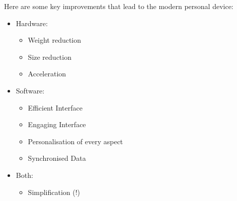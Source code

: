 Here are some key improvements that lead to the modern personal device:
\begin{itemize}
\item Hardware:
\begin{itemize}
\item Weight reduction
\item Size reduction
\item Acceleration
\end{itemize}
\item Software:
\begin{itemize}
\item Efficient Interface
\item Engaging Interface
\item Personalisation of every aspect
\item Synchronised Data
\end{itemize}
\item Both:
\begin{itemize}
\item Simplification (!)
\end{itemize}
\end{itemize}
